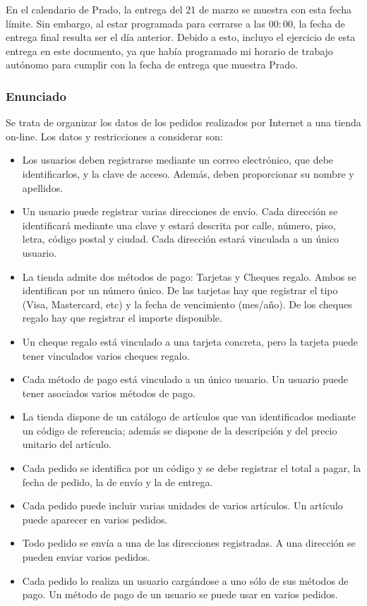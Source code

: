 En el calendario de Prado, la entrega del 21 de marzo se muestra con esta fecha límite.
Sin embargo, al estar programada para cerrarse a las $00:00$, la fecha de entrega final resulta ser el día anterior.
Debido a esto, incluyo el ejercicio de esta entrega en este documento, ya que había programado mi horario de trabajo autónomo para cumplir con la fecha de entrega que muestra Prado.

\subsubsection{Enunciado}

Se trata de organizar los datos de los pedidos realizados por Internet a una tienda on-line.
Los datos y restricciones a considerar son:

\begin{itemize}
	\item Los usuarios deben registrarse mediante un correo electrónico, que debe identificarlos, y la clave de acceso. Además, deben proporcionar su nombre y apellidos. 
	\item Un usuario puede registrar varias direcciones de envío. Cada dirección se identificará mediante una clave y estará descrita por calle, número, piso, letra, código postal y ciudad. Cada dirección estará vinculada a un único usuario.
	\item La tienda admite dos métodos de pago: Tarjetas y Cheques regalo. Ambos se identifican por un número único. De las tarjetas hay que registrar el tipo (Visa, Mastercard, etc) y la fecha de vencimiento (mes/año). De los cheques regalo hay que registrar el importe disponible.
	\item Un cheque regalo está vinculado a una tarjeta concreta, pero la tarjeta puede tener vinculados varios cheques regalo.
	\item Cada método de pago está vinculado a un único usuario. Un usuario puede tener asociados varios métodos de pago.
	\item La tienda dispone de un catálogo de artículos que van identificados mediante un código de referencia; además se dispone de la descripción y del precio unitario del artículo.
	\item Cada pedido se identifica por un código y se debe registrar el total a pagar, la fecha de pedido, la de envío y la de entrega.
	\item Cada pedido puede incluir varias unidades de varios artículos. Un artículo puede aparecer en varios pedidos.
	\item Todo pedido se envía a una de las direcciones registradas. A una dirección se pueden enviar varios pedidos.
	\item Cada pedido lo realiza un usuario cargándose a uno sólo de sus métodos de pago. Un método de pago de un usuario se puede usar en varios pedidos.
\end{itemize}

